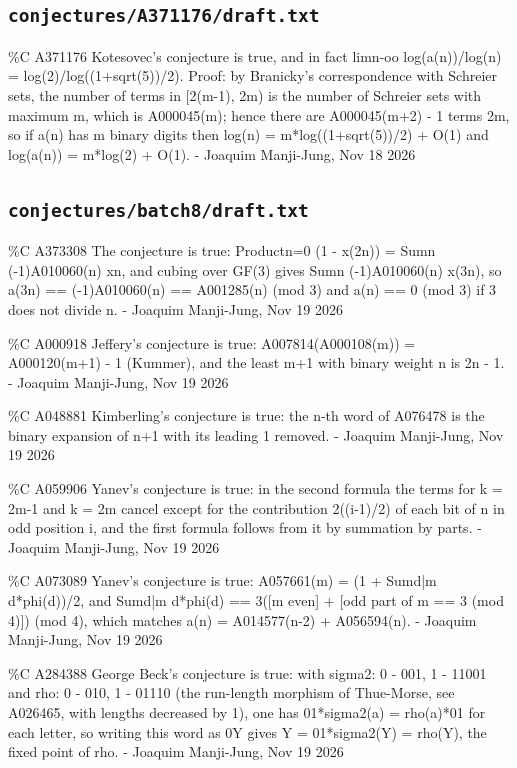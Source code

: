 \subsection*{\texttt{conjectures/A371176/draft.txt}}
{\small\raggedright\ttfamily
\%C A371176 Kotesovec's conjecture is true, and in fact limn-oo log(a(n))/log(n) = log(2)/log((1+sqrt(5))/2). Proof: by Branicky's correspondence with Schreier sets, the number of terms in [2(m-1), 2m) is the number of Schreier sets with maximum m, which is A000045(m); hence there are A000045(m+2) - 1 terms  2m, so if a(n) has m binary digits then log(n) = m*log((1+sqrt(5))/2) + O(1) and log(a(n)) = m*log(2) + O(1). - Joaquim Manji-Jung, Nov 18 2026\par
}
\subsection*{\texttt{conjectures/batch8/draft.txt}}
{\small\raggedright\ttfamily
\%C A373308 The conjecture is true: Productn=0 (1 - x(2n)) = Sumn (-1)A010060(n) xn, and cubing over GF(3) gives Sumn (-1)A010060(n) x(3n), so a(3n) == (-1)A010060(n) == A001285(n) (mod 3) and a(n) == 0 (mod 3) if 3 does not divide n. - Joaquim Manji-Jung, Nov 19 2026\par
\%C A000918 Jeffery's conjecture is true: A007814(A000108(m)) = A000120(m+1) - 1 (Kummer), and the least m+1 with binary weight n is 2n - 1. - Joaquim Manji-Jung, Nov 19 2026\par
\%C A048881 Kimberling's conjecture is true: the n-th word of A076478 is the binary expansion of n+1 with its leading 1 removed. - Joaquim Manji-Jung, Nov 19 2026\par
\%C A059906 Yanev's conjecture is true: in the second formula the terms for k = 2m-1 and k = 2m cancel except for the contribution 2((i-1)/2) of each bit of n in odd position i, and the first formula follows from it by summation by parts. - Joaquim Manji-Jung, Nov 19 2026\par
\%C A073089 Yanev's conjecture is true: A057661(m) = (1 + Sumd|m d*phi(d))/2, and Sumd|m d*phi(d) == 3([m even] + [odd part of m == 3 (mod 4)]) (mod 4), which matches a(n) = A014577(n-2) + A056594(n). - Joaquim Manji-Jung, Nov 19 2026\par
\%C A284388 George Beck's conjecture is true: with sigma2: 0 - 001, 1 - 11001 and rho: 0 - 010, 1 - 01110 (the run-length morphism of Thue-Morse, see A026465, with lengths decreased by 1), one has 01*sigma2(a) = rho(a)*01 for each letter, so writing this word as 0Y gives Y = 01*sigma2(Y) = rho(Y), the fixed point of rho. - Joaquim Manji-Jung, Nov 19 2026\par
}
